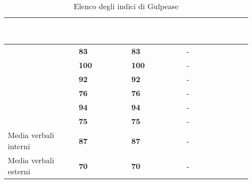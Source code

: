 \renewcommand{\arraystretch}{1.5}
\begin{longtable}{C{4cm} C{2cm} C{2cm} C{2cm} C{2cm}}
	\caption{Elenco degli indici di Gulpease }\\
	\textcolor{white}{\textbf{Documento}} & \textcolor{white}{\textbf{I periodo RP}} &
	\textcolor{white}{\textbf{II periodo RP}} & \textcolor{white}{\textbf{III periodo RP}} \\
	\hline
	\endhead
	\AdR & \textcolor{verde}{\textbf{83}} & \textcolor{verde}{\textbf{83}} & - \\
	\PdP & \textcolor{verde}{\textbf{100}} & \textcolor{verde}{\textbf{100}} & - \\
	\PdQ & \textcolor{verde}{\textbf{92}} & \textcolor{verde}{\textbf{92}} & - \\

	\NdP & \textcolor{giallo}{\textbf{76}} & \textcolor{giallo}{\textbf{76}} & - \\
	\SdF & \textcolor{verde}{\textbf{94}} & \textcolor{verde}{\textbf{94}} & - \\

	\Glossario & \textcolor{giallo}{\textbf{75}} & \textcolor{giallo}{\textbf{75}} & - \\

	Media verbali interni & \textcolor{verde}{\textbf{87}} & \textcolor{verde}{\textbf{87}} & - \\
	Media verbali esterni & \textcolor{giallo}{\textbf{70}} & \textcolor{giallo}{\textbf{70}}  & - \\
	
\end{longtable}


